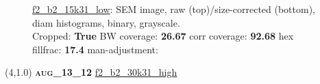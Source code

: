 \begin{figure}[h!]
\label{semimg28}
\caption*{\hyperlink{covtableaug_13_12}{\color{blue} \small \ttfamily f2\_b2\_15k31\_low}: SEM image, raw (top)/size-corrected (bottom), diam histograms, binary, grayscale.\\Cropped: {\bf True} \;\; BW coverage: {\bf 26.67} \:\: corr coverage: {\bf 92.68} \:\: hex fillfrac: {\bf 17.4} \:\: man-adjustment: {\bf \color{blue}{Yes}}}
\end{figure}
\newpage

\begin{textblock}{5}(4,1.0)
{\bf \textsc{aug\_13\_12}}
\hspace{4.5cm}
\hyperlink{covtableaug_13_12}{\color{blue} \large \ttfamily f2\_b2\_30k31\_high}
\end{textblock}

